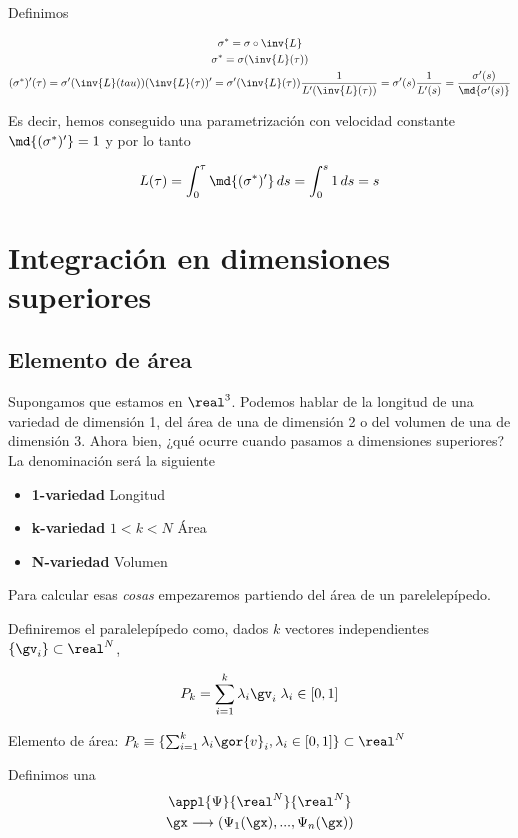 Definimos

\begin{gather*}
\sigma^\ast = \sigma \circ \inv{L} \\
\sigma^\ast = \sigma(\inv{L}(\tau)) \\
(\sigma^\ast)'(\tau) = \sigma'(\inv{L}(tau)) (\inv{L}(\tau))' = \sigma'(\inv{L}(\tau)) \frac{1}{L'(\inv{L}(\tau))} = \sigma'(s) \frac{1}{L'(s)} = \frac{\sigma'(s)}{\md{\sigma'(s)}}
\end{gather*}

Es decir, hemos conseguido una parametrización con velocidad constante $\md{(\sigma^\ast)'} = 1$ y por lo tanto

\[ L(\tau) = \int_0^\tau \md{(\sigma^\ast)'}\,ds = \int_0^s 1\,ds = s \]

\section{Integración en dimensiones superiores}

\subsection{Elemento de área}

Supongamos que estamos en $\real^3$. Podemos hablar de la longitud de una variedad de dimensión 1, del área de una de dimensión 2 o del volumen de una de dimensión 3. Ahora bien, ¿qué ocurre cuando pasamos a dimensiones superiores? La denominación será la siguiente

\begin{itemize}
\item \textbf{1-variedad} Longitud
\item \textbf{k-variedad} $1<k<N$ Área
\item \textbf{N-variedad} Volumen
\end{itemize}

Para calcular esas \textit{cosas} empezaremos partiendo del área de un parelelepípedo.

Definiremos el paralelepípedo como, dados $k$ vectores independientes $\{\gv_i\} \subset \real^N$,

\[ P_k = \sum_{i=1}^k \lambda_i\gv_i\;\lambda_i \in [0,1] \]


Elemento de área: $P_k \equiv \{ \sum_{i=1}^k \lambda_i\gor{v}_i, \lambda_i \in [0,1]\}\subset \real^N$

Definimos una \begin{gather*}
\appl{\Psi}{\real^N}{\real^N}\\
\gx \longrightarrow (\Psi_1(\gx),...,\Psi_n(\gx))
\end{gather*}

